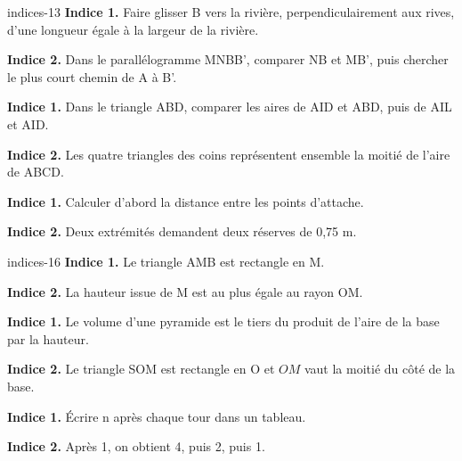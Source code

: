 \begin{blocEdition}{indices-13}
\textbf{Indice 1.} Faire glisser B vers la rivière, perpendiculairement aux rives, d’une longueur égale à la largeur de la rivière.\par\medskip\textbf{Indice 2.} Dans le parallélogramme MNBB’, comparer NB et MB’, puis chercher le plus court chemin de A à B’.\par
{}\textbf{Indice 1.} Dans le triangle ABD, comparer les aires de AID et ABD, puis de AIL et AID.\par\medskip\textbf{Indice 2.} Les quatre triangles des coins représentent ensemble la moitié de l’aire de ABCD.\par
{}\textbf{Indice 1.} Calculer d’abord la distance entre les points d’attache.\par\medskip\textbf{Indice 2.} Deux extrémités demandent deux réserves de 0,75 m.\par

\end{blocEdition}
\begin{blocEdition}{indices-16}
\textbf{Indice 1.} Le triangle AMB est rectangle en M.\par\medskip\textbf{Indice 2.} La hauteur issue de M est au plus égale au rayon OM.\par
{}\textbf{Indice 1.} Le volume d’une pyramide est le tiers du produit de l’aire de la base par la hauteur.\par\medskip\textbf{Indice 2.} Le triangle SOM est rectangle en O et $OM$ vaut la moitié du côté de la base.\par
{}\textbf{Indice 1.} Écrire n après chaque tour dans un tableau.\par\medskip\textbf{Indice 2.} Après 1, on obtient 4, puis 2, puis 1.\par

\end{blocEdition}
